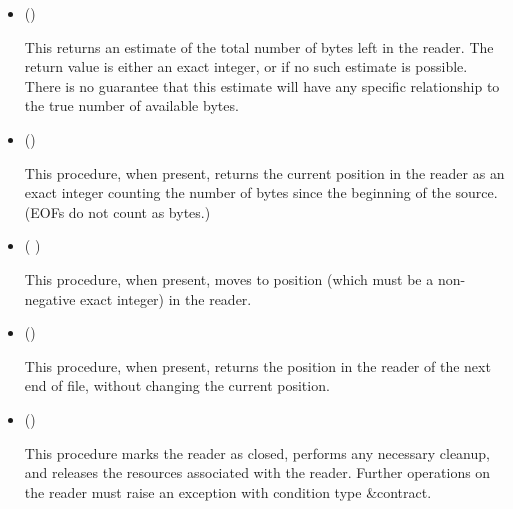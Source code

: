 \begin{entry}{%
}
\begin{itemize}
   and  must be non-negative exact integers.
  This reads up to  bytes from the reader and writes them
  into , which must be a bytes object, starting at index
  start.  must have size at least $\var{start} +
  \var{count}$. This procedure returns the number of bytes read as an
  exact integer. It returns 0 if it encounters an end of file, or if
  count is 0. If count is positive, this procedure blocks until at
  least one byte has been read or it has encountered end of file.
  
   may or may not be a bytes object returned by {\cf
    make-i/o-buffer}. It is possible that {\cf reader-read!} operates
  more efficiently if it is, however.
  
   may or may not be the same as the chunk size of the
  reader. It is possible that {\cf reader-read!} operates more
  efficiently if it is, however.

\item {\cf ()}
       
  This returns an estimate of the total number of bytes left in the
  reader. The return value is either an exact integer, or
  \schfalse{} if no such estimate is possible. There is no guarantee
  that this estimate will have any specific relationship to the true
  number of available bytes.

\item {\cf ()}
       
  This procedure, when present, returns the current position in the 
  reader as an exact integer counting the number of bytes since the
  beginning of the source. (EOFs do not count as bytes.)
  
\item {\cf ( )}
       
  This procedure, when present, moves to position  (which
  must be a non-negative exact integer) in the reader.
       
\item {\cf ()}
       
  This procedure, when present, returns the position in the reader
  of the next end of file, without changing the current position.

\item {\cf ()}
       
  This procedure marks the reader as closed, performs any necessary
  cleanup, and releases the resources associated with the reader.
  Further operations on the reader must raise an exception with
  condition type {\cf\&contract}.
\end{itemize}

\end{entry}

